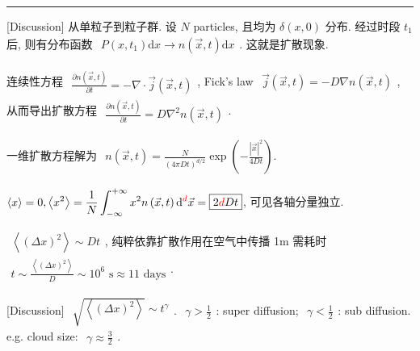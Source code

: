 \documentclass[../../main.tex]{subfiles}
\begin{document}
\vspace{0.5em}\hrule\vspace{0.5em}
[Discussion] 从单粒子到粒子群. 设 $N$ particles, 且均为 $\delta(x,0)$ 分布. 经过时段 $t_{1}$ 后, 则有分布函数 $\begin{aligned}
    P(x,t_{1})\mathrm{d}x\rightarrow n\left(\vec{x},t\right)\mathrm{d}x
\end{aligned}$. 这就是扩散现象. 

连续性方程 $\begin{aligned}
    \frac{\partial n\left(\vec{x},t\right)}{\partial t} = -\nabla\cdot\vec{j}\left(\vec{x},t\right)
\end{aligned}$, Fick's law $\begin{aligned}
    \vec{j}\left(\vec{x},t\right) = -D\nabla n\left(\vec{x},t\right)
\end{aligned}$, 从而导出扩散方程 $\begin{aligned}
    \frac{\partial n\left(\vec{x},t\right)}{\partial t} = D\nabla^{2}n\left(\vec{x},t\right)
\end{aligned}$. 

一维扩散方程解为 $\begin{aligned}
    n\left(\vec{x},t\right) = \frac{N}{(4\pi Dt)^{d/2}}\exp{\left(-\frac{|\vec{x}|^{2}}{4Dt}\right)}.
\end{aligned}$

$\begin{aligned}
    \langle x\rangle = 0, \left\langle x^{2}\right\rangle = \frac{1}{N}\int_{-\infty}^{+\infty} x^{2} n\left(\vec{x},t\right)\mathrm{d}^{{\color{red}{d}}}\vec{x} = \boxed{2{\color{red}{d}}Dt}
\end{aligned}$, 可见各轴分量独立. 

$\begin{aligned}
    \left\langle (\Delta x)^{2}\right\rangle \sim Dt
\end{aligned}$, 纯粹依靠扩散作用在空气中传播 1m 需耗时 $\begin{aligned}
    t\sim \frac{\left\langle (\Delta x)^{2}\right\rangle}{D}\sim 10^{6}\text{ s}\approx 11\text{ days}
\end{aligned}$. 


[Discussion] $\begin{aligned}
    \sqrt{\left\langle (\Delta x)^{2}\right\rangle}\sim t^{\gamma}
\end{aligned}$. $\begin{aligned}
    \gamma > \frac{1}{2}
\end{aligned}$: super diffusion; $\begin{aligned}
    \gamma < \frac{1}{2}
\end{aligned}$: sub diffusion. e.g. cloud size: $\begin{aligned}
    \gamma\approx \frac{3}{2}
\end{aligned}$. 
\end{document}
